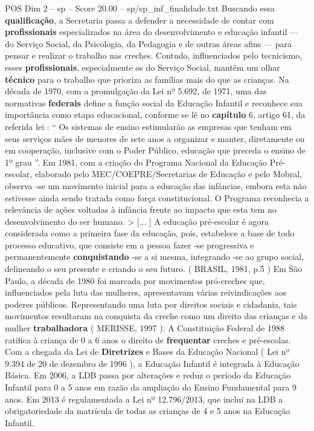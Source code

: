 \begin{textsample}{POS Dim 2 – sp – Score 20.00 – sp/sp\_inf\_finalidade.txt}
Buscando essa \textbf{qualificação}, a Secretaria passa a defender a necessidade de contar com \textbf{profissionais} especializados na área do desenvolvimento e educação infantil — do Serviço Social, da Psicologia, da Pedagogia e de outras áreas afins — para pensar e realizar o trabalho nas creches.
Contudo, influenciados pelo tecnicismo, esses \textbf{profissionais}, especialmente os do Serviço Social, mantêm um olhar \textbf{técnico} para o trabalho que prioriza as famílias mais do que as crianças.
Na década de 1970, com a promulgação da Lei nº 5.692, de 1971, uma das normativas \textbf{federais} define a função social da Educação Infantil e reconhece sua importância como etapa educacional, conforme se lê no \textbf{capítulo} 6, artigo 61, da referida lei : “ Os sistemas de ensino estimularão as empresas que tenham em seus serviços mães de menores de sete anos a organizar e manter, diretamente ou em cooperação, inclusive com o Poder Público, educação que preceda o ensino de 1º grau ”.
Em 1981, com a criação do Programa Nacional da Educação Pré-escolar, elaborado pelo MEC/COEPRE/Secretarias de Educação e pelo Mobral, observa -se um movimento inicial para a educação das infâncias, embora esta não estivesse ainda sendo tratada como força constitucional.
O Programa reconhecia a relevância de ações voltadas à infância frente ao impacto que esta tem no desenvolvimento do ser humano. > [... ] A educação pré-escolar é agora considerada como a primeira fase da educação, pois, estabelece a base de todo processo educativo, que consiste em a pessoa fazer -se progressiva e permanentemente \textbf{conquistando} -se a si mesma, integrando -se ao grupo social, delineando o seu presente e criando o seu futuro. ( BRASIL, 1981, p.5 ) Em São Paulo, a década de 1980 foi marcada por movimentos pró-creches que, influenciados pela luta das mulheres, apresentavam várias reivindicações aos poderes públicos.
Representando uma luta por direitos sociais e cidadania, tais movimentos resultaram na conquista da creche como um direito das crianças e da mulher \textbf{trabalhadora} ( MERISSE, 1997 ).
A Constituição Federal de 1988 ratifica à criança de 0 a 6 anos o direito de \textbf{frequentar} creches e pré-escolas.
Com a chegada da Lei de \textbf{Diretrizes} e Bases da Educação Nacional ( Lei nº 9.394 de 20 de dezembro de 1996 ), a Educação Infantil é integrada à Educação Básica.
Em 2006, a LDB passa por alterações e reduz o período da Educação Infantil para 0 a 5 anos em razão da ampliação do Ensino Fundamental para 9 anos.
Em 2013 é regulamentada a Lei nº 12.796/2013, que inclui na LDB a obrigatoriedade da matrícula de todas as crianças de 4 e 5 anos na Educação Infantil.

\end{textsample}
